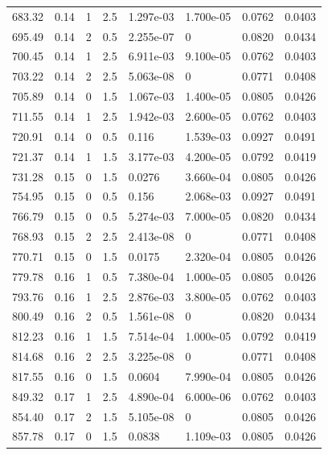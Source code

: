 \documentclass[preview]{standalone}
\begin{document}
{{{\begin{tabular}{L{1.2cm}C{1.2cm} C{0.3cm}C{0.5cm} C{1.4cm}C{1.4cm} C{1.4cm}C{1.4cm}}
  683.32  &  0.14  & 1     & 2.5 &  1.297e-03  & 1.700e-05  & 0.0762 &  0.0403   \\ 
  695.49  &  0.14  & 2     & 0.5 &  2.255e-07  & 0  & 0.0820 &  0.0434   \\ 
  700.45  &  0.14  & 1     & 2.5 &  6.911e-03  & 9.100e-05  & 0.0762 &  0.0403   \\ 
  703.22  &  0.14  & 2     & 2.5 &  5.063e-08  & 0  & 0.0771 &  0.0408   \\ 
  705.89  &  0.14  & 0     & 1.5 &  1.067e-03  & 1.400e-05  & 0.0805 &  0.0426   \\ 
  711.55  &  0.14  & 1     & 2.5 &  1.942e-03  & 2.600e-05  & 0.0762 &  0.0403   \\ 
  720.91  &  0.14  & 0     & 0.5 &  0.116  & 1.539e-03  & 0.0927 &  0.0491   \\ 
  721.37  &  0.14  & 1     & 1.5 &  3.177e-03  & 4.200e-05  & 0.0792 &  0.0419   \\ 
  731.28  &  0.15  & 0     & 1.5 &  0.0276  & 3.660e-04  & 0.0805 &  0.0426   \\ 
  754.95  &  0.15  & 0     & 0.5 &  0.156  & 2.068e-03  & 0.0927 &  0.0491   \\ 
  766.79  &  0.15  & 0     & 0.5 &  5.274e-03  & 7.000e-05  & 0.0820 &  0.0434   \\ 
  768.93  &  0.15  & 2     & 2.5 &  2.413e-08  & 0  & 0.0771 &  0.0408   \\ 
  770.71  &  0.15  & 0     & 1.5 &  0.0175  & 2.320e-04  & 0.0805 &  0.0426   \\ 
  779.78  &  0.16  & 1     & 0.5 &  7.380e-04  & 1.000e-05  & 0.0805 &  0.0426   \\ 
  793.76  &  0.16  & 1     & 2.5 &  2.876e-03  & 3.800e-05  & 0.0762 &  0.0403   \\ 
  800.49  &  0.16  & 2     & 0.5 &  1.561e-08  & 0  & 0.0820 &  0.0434   \\ 
  812.23  &  0.16  & 1     & 1.5 &  7.514e-04  & 1.000e-05  & 0.0792 &  0.0419   \\ 
  814.68  &  0.16  & 2     & 2.5 &  3.225e-08  & 0  & 0.0771 &  0.0408   \\ 
  817.55  &  0.16  & 0     & 1.5 &  0.0604  & 7.990e-04  & 0.0805 &  0.0426   \\ 
  849.32  &  0.17  & 1     & 2.5 &  4.890e-04  & 6.000e-06  & 0.0762 &  0.0403   \\ 
  854.40  &  0.17  & 2     & 1.5 &  5.105e-08  & 0  & 0.0805 &  0.0426   \\ 
  857.78  &  0.17  & 0     & 1.5 &  0.0838  & 1.109e-03  & 0.0805 &  0.0426   \\ 

\end{tabular}}}}
\end{document}

